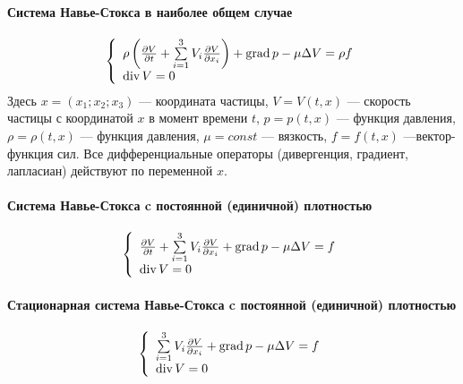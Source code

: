 \paragraph{Система Навье-Стокса в наиболее общем случае}
$$
	\left\{
		\begin{array}{l}
		\rho\left(
			\frac{\partial V}{\partial t}+\sum\limits_{i=1}^{3}V_i\frac{\partial V}{\partial x_i}
		\right) + \operatorname{grad} p - \mu \Delta V = \rho f
		\\
		\operatorname{div} V = 0
		\end{array}
	\right.
$$
Здесь
$x = (x_1; x_2; x_3)$ --- координата частицы,
$V = V(t,x)$ --- скорость частицы с координатой $x$ в момент времени $t$,
$p = p(t,x)$ --- функция давления,
$\rho = \rho(t,x)$ --- функция давления,
$\mu = const$ --- вязкость,
$f = f(t,x)$ ---вектор-функция сил.
Все дифференциальные операторы (дивергенция, градиент, лапласиан)
действуют по переменной $x$.

\paragraph{Система Навье-Стокса c постоянной (единичной) плотностью}
$$
	\left\{
		\begin{array}{l}
		\frac{\partial V}{\partial t}+\sum\limits_{i=1}^{3}V_i\frac{\partial V}{\partial x_i}
		+ \operatorname{grad} p - \mu \Delta V = f
		\\
		\operatorname{div} V = 0
		\end{array}
	\right.
$$


\paragraph{Стационарная система Навье-Стокса c постоянной (единичной) плотностью}
$$
	\left\{
		\begin{array}{l}
		\sum\limits_{i=1}^{3}V_i\frac{\partial V}{\partial x_i}
		+ \operatorname{grad} p - \mu \Delta V = f
		\\
		\operatorname{div} V = 0
		\end{array}
	\right.
$$
